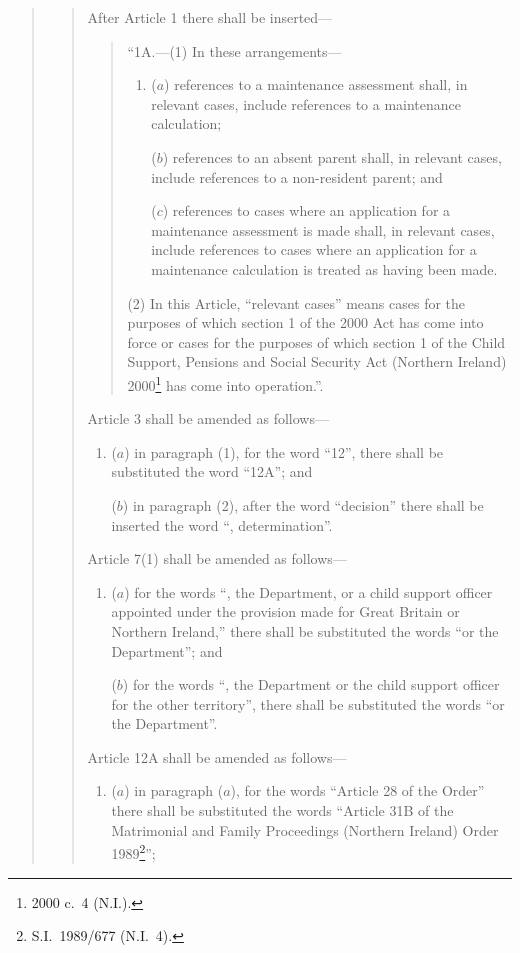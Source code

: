 \documentclass[12pt,a4paper]{article}
\begin{document}
\begin{quotation}
\begin{quotation}
After Article 1 there shall be inserted—
\begin{quotation}
“1A.---(1)  In these arrangements—
\begin{enumerate}\item[]
($a$) references to a maintenance assessment shall, in relevant cases, include references to a maintenance calculation;

($b$) references to an absent parent shall, in relevant cases, include references to a non-resident parent; and

($c$) references to cases where an application for a maintenance assessment is made shall, in relevant cases, include references to cases where an application for a maintenance calculation is treated as having been made.
\end{enumerate}

(2) In this Article, “relevant cases” means cases for the purposes of which section 1 of the 2000 Act has come into force or cases for the purposes of which section 1 of the Child Support, Pensions and Social Security Act (Northern Ireland) 2000\footnote{2000 c.\ 4 (N.I.).} has come into operation.”.
\end{quotation}

Article 3 shall be amended as follows—
\begin{enumerate}\item[]
($a$) in paragraph (1), for the word “12”, there shall be substituted the word “12A”; and

($b$) in paragraph (2), after the word “decision” there shall be inserted the word “, determination”.
\end{enumerate}

Article 7(1) shall be amended as follows—
\begin{enumerate}\item[]
($a$) for the words “, the Department, or a child support officer appointed under the provision made for Great Britain or Northern Ireland,” there shall be substituted the words “or the Department”; and

($b$) for the words “, the Department or the child support officer for the other territory”, there shall be substituted the words “or the Department”.
\end{enumerate}

Article 12A shall be amended as follows—
\begin{enumerate}\item[]
($a$) in paragraph ($a$), for the words “Article 28 of the Order” there shall be substituted the words “Article 31B of the Matrimonial and Family Proceedings (Northern Ireland) Order 1989\footnote{S.I.\ 1989/677 (N.I.\ 4).}”;


\end{enumerate}
\end{quotation}
\end{quotation}
\end{document}
